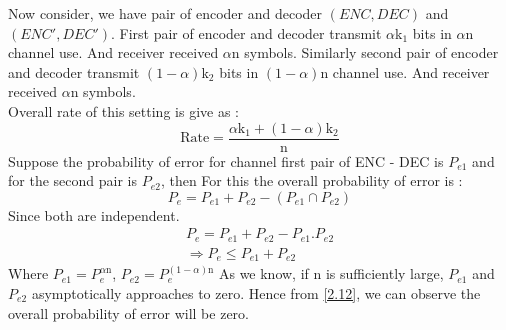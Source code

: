 \documentclass{article}
\begin{document}
%  
%  
Now consider, we have pair of encoder and decoder $\left( ENC, DEC\right)$ and $\left( ENC', DEC'\right)$. First pair of encoder and decoder transmit $\alpha$k$_{1}$  bits in $\alpha$n channel use. And receiver received $\alpha$n symbols. Similarly second pair of  encoder and decoder transmit $ \left (1 - \alpha \right)$k$_{2}$  bits in $ \left( 1 -\alpha \right)$n channel use. And receiver received $\alpha$n symbols. \\ Overall rate of this setting is give as :
\begin{equation} 
	\text{Rate} = \frac{ \alpha \text{k}_1 + (1 - \alpha)\text{k}_2}{\text{n}}
\end{equation}
Suppose the probability of error for channel first pair of ENC - DEC is $P_{e1}$ and for the second pair is $P_{e2}$, then
For this the overall probability of error  is :
\begin{equation}
	P_e = P_{e1} + P_{e2} -( P_{e1} \cap P_{e2})  \label{2.12}
\end{equation}
Since both are independent.
\begin{align}
	P_e = P_{e1} + P_{e2} - P_{e1}.P_{e2}  \label{2.13} \\
	\Rightarrow P_{e} \leq P_{e1} + P_{e2} \label{2.14}
\end{align}
Where $P_{e1} = P_{e}^{\alpha \text{n}}$, $P_{e2} = P_{e}^{\left (1 - \alpha \right ) \text{n}}$ 
As we know, if n is sufficiently large, $P_{e1}$ and $P_{e2}$ asymptotically approaches to zero. Hence from \ref{2.12}, we can observe the overall probability of error will be zero.



 
  
  
  
  
\end{document}
